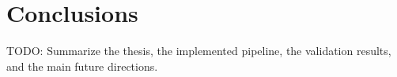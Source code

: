 \chapter{Conclusions}

TODO: Summarize the thesis, the implemented pipeline, the validation results, and the main future directions.

